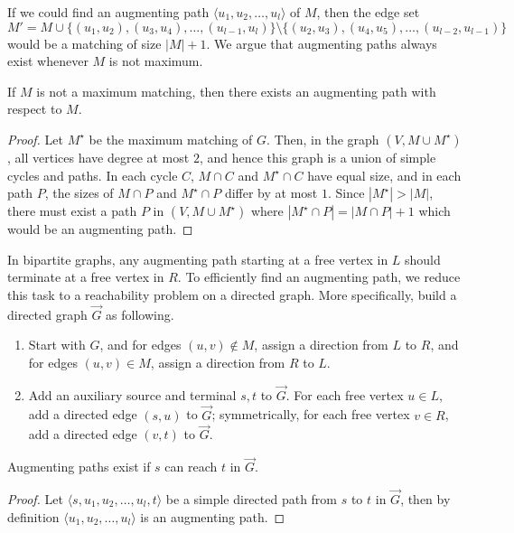 If we could find an augmenting path $\langle u_1, u_2, \ldots, u_l\rangle$ of $M$, then the edge set $$M' = M\cup \{(u_1, u_2), (u_3, u_4), \ldots, (u_{l-1}, u_l)\}\setminus \{(u_2, u_3), (u_4, u_5), \ldots, (u_{l-2}, u_{l-1})\}$$ would be a matching of size $|M|+1$. We argue that augmenting paths always exist whenever $M$ is not maximum.
\begin{lemma}
	If $M$ is not a maximum matching, then there exists an augmenting path with respect to $M$.
\end{lemma}
\begin{proof}
	Let $M^\star$ be the maximum matching of $G$. Then, in the graph $(V, M\cup M^\star)$, all vertices have degree at most $2$, and hence this graph is a union of simple cycles and paths. In each cycle $C$, $M\cap C$ and $M^\star\cap C$ have equal size, and in each path $P$, the sizes of $M\cap P$ and $M^\star\cap P$ differ by at most $1$. Since $|M^\star| > |M|$, there must exist a path $P$ in $(V, M\cup M^\star)$ where $|M^\star\cap P| = |M\cap P|+1$ which would be an augmenting path.
\end{proof}

In bipartite graphs, any augmenting path starting at a free vertex in $L$ should terminate at a free vertex in $R$. To efficiently find an augmenting path, we reduce this task to a reachability problem on a directed graph. More specifically, build a directed graph $\overrightarrow{G}$ as following.
\begin{enumerate}
	\item Start with $G$, and for edges $(u, v)\notin M$, assign a direction from $L$ to $R$, and for edges $(u, v)\in M$, assign a direction from $R$ to $L$.
	
	\item Add an auxiliary source and terminal $s, t$ to $\overrightarrow{G}$. For each free vertex $u\in L$, add a directed edge $(s, u)$ to $\overrightarrow{G}$; symmetrically, for each free vertex $v\in R$, add a directed edge $(v, t)$ to $\overrightarrow{G}$.
\end{enumerate}

\begin{lemma}
	Augmenting paths exist if $s$ can reach $t$ in $\overrightarrow{G}$.
\end{lemma}
\begin{proof}
	Let $\langle s, u_1, u_2, \ldots, u_l, t\rangle$ be a simple directed path from $s$ to $t$ in $\overrightarrow{G}$, then by definition $\langle u_1, u_2, \ldots, u_l\rangle$ is an augmenting path.
\end{proof}

